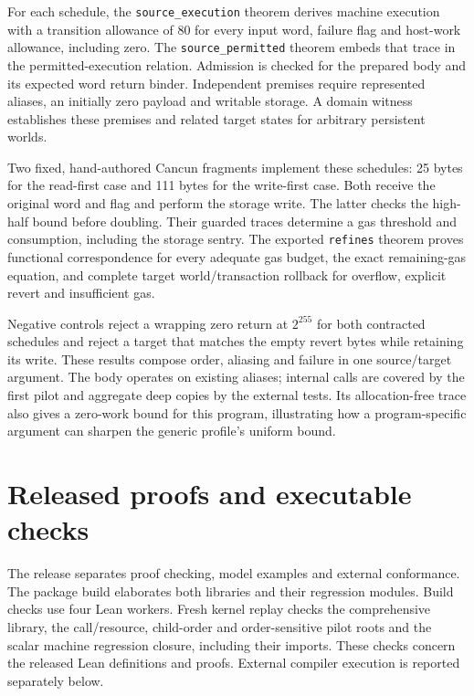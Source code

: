 \documentclass[conference]{IEEEtran}
\newcommand{\code}[1]{\texttt{#1}}
\begin{document}
For each schedule, the \code{source\_execution} theorem derives machine execution
with a transition allowance of 80 for every input word, failure flag and host-work
allowance, including zero. The \code{source\_permitted} theorem embeds that
trace in the permitted-execution relation. Admission is checked for the
prepared body and its expected word return binder. Independent premises require
represented aliases, an initially zero payload and writable storage. A domain
witness establishes these premises and related target states for arbitrary
persistent worlds.

Two fixed, hand-authored Cancun fragments implement these schedules: 25 bytes
for the read-first case and 111 bytes for the write-first case. Both receive the
original word and flag and perform the storage write. The latter checks the
high-half bound before doubling. Their guarded traces determine a gas
threshold and consumption, including the storage sentry. The exported
\code{refines} theorem proves functional correspondence for every adequate gas
budget, the exact remaining-gas equation, and complete target world/transaction
rollback for overflow, explicit revert and insufficient gas.

Negative controls reject a wrapping zero return at $2^{255}$ for both contracted
schedules and reject a target that matches the empty revert bytes while retaining its
write. These results compose order, aliasing and failure in one source/target
argument. The body operates on existing aliases; internal calls are covered by
the first pilot and aggregate deep copies by the external tests. Its
allocation-free trace also gives a zero-work bound for this program, illustrating
how a program-specific argument can sharpen the generic profile's uniform bound.

\section{Released proofs and executable checks}
\label{sec:evaluation}
The release separates proof checking, model examples and external conformance.
The package build elaborates both libraries and their regression modules. Build checks use four Lean workers. Fresh kernel
replay checks the comprehensive library, the call/resource, child-order and order-sensitive pilot roots and the scalar
machine regression closure, including their imports. These checks concern the released Lean definitions and proofs. External
compiler execution is reported separately below.
\end{document}
